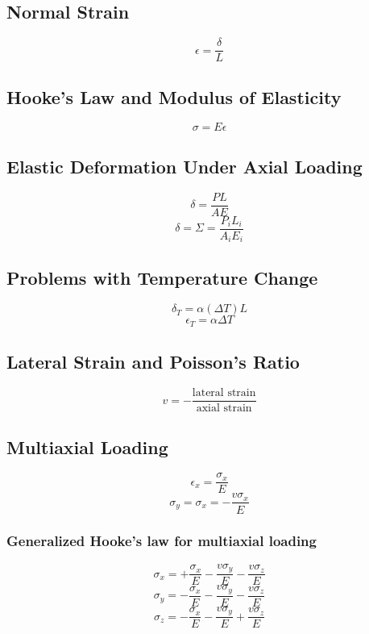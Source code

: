 \documentclass[10pt,landscape]{article}
\begin{document}
\begin{multicols}{3}
\subsection{Normal Strain}
\begin{equation}
    \epsilon=\frac{\delta}{L}
\end{equation}
\subsection{Hooke's Law and Modulus of Elasticity}
\begin{equation}
    \sigma=E\epsilon
\end{equation}
\subsection{Elastic Deformation Under Axial Loading}
\begin{equation}
    \delta=\frac{PL}{AE}
\end{equation}
\begin{equation}
    \delta=\Sigma=\frac{P_iL_i}{A_iE_i}
\end{equation}
\subsection{Problems with Temperature Change}
\begin{equation}
    \delta_T=\alpha(\Delta T)L     
\end{equation}
\begin{equation}
    \epsilon_T=\alpha\Delta T
\end{equation}
\subsection{Lateral Strain and Poisson's Ratio}
\begin{equation}
    v=-\frac{\text{lateral strain}}{\text{axial strain}}
\end{equation}
\subsection{Multiaxial Loading}
\begin{equation}
    \epsilon_x=\frac{\sigma_x}{E}
\end{equation}
\begin{equation}
    \sigma_y=\sigma_x=-\frac{v\sigma_x}{E}
\end{equation}
\subsubsection{Generalized Hooke's law for multiaxial loading}
\begin{equation}
    \sigma_x=+\frac{\sigma_x}{E}-\frac{v\sigma_y}{E}-\frac{v\sigma_z}{E}
\end{equation}
\begin{equation}
    \sigma_y=-\frac{\sigma_x}{E}-\frac{v\sigma_y}{E}-\frac{v\sigma_z}{E}
\end{equation}
\begin{equation}
    \sigma_z=-\frac{\sigma_x}{E}-\frac{v\sigma_y}{E}+\frac{v\sigma_z}{E}
\end{equation}

\end{multicols}
\end{document}
